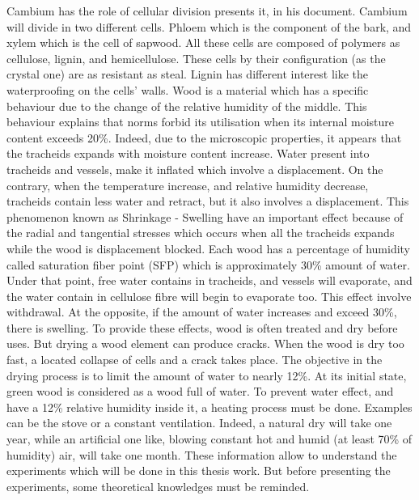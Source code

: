 Cambium has the role of cellular division \parencite{Reference4} presents it, in his document. Cambium will divide in two different cells. Phloem which is the component of the bark, and xylem which is the cell of sapwood.  All these cells are composed of polymers as cellulose, lignin, and hemicellulose. These cells by their configuration (as the crystal one) are as resistant as steal. Lignin has different interest like the waterproofing on the cells’ walls. 
Wood is a material which has a specific behaviour due to the change of the relative humidity of the middle. This behaviour explains that norms forbid its utilisation when its internal moisture content exceeds 20\%. Indeed, due to the microscopic properties, it appears that the tracheids expands with moisture content increase. Water present into tracheids and vessels, make it inflated which involve a displacement. On the contrary, when the temperature increase, and relative humidity decrease, tracheids contain less water and retract, but it also involves a displacement. This phenomenon known as Shrinkage - Swelling have an important effect because of the radial and tangential stresses which occurs when all the tracheids expands while the wood is displacement blocked. 
Each wood has a percentage of humidity called saturation fiber point (SFP) which is approximately 30\% amount of water. Under that point, free water contains in tracheids, and vessels will evaporate, and the water contain in cellulose fibre will begin to evaporate too. This effect involve withdrawal. At the opposite, if the amount of water increases and exceed 30\%, there is swelling. 
To provide these effects, wood is often treated and dry before uses. But drying a wood element can produce cracks. When the wood is dry too fast, a located collapse of cells and a crack takes place. The objective in the drying process is to limit the amount of water to nearly 12\%. At its initial state, green wood is considered as a wood full of water. To prevent water effect, and have a 12\% relative humidity inside it, a heating process must be done. Examples can be the stove or a constant ventilation. Indeed, a natural dry will take one year, while an artificial one like, blowing constant hot and humid (at least 70\% of humidity) air, will take one month. 
These information allow to understand the experiments which will be done in this thesis work. But before presenting the experiments, some theoretical knowledges must be reminded. 



